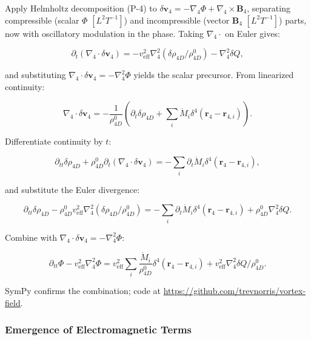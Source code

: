 Apply Helmholtz decomposition (P-4) to $\delta \mathbf{v}_4 = -\nabla_4 \Phi + \nabla_4 \times \mathbf{B}_4$, separating compressible (scalar $\Phi$ $[L^2 T^{-1}]$) and incompressible (vector $\mathbf{B}_4$ $[L^2 T^{-1}]$) parts, now with oscillatory modulation in the phase. Taking $\nabla_4 \cdot$ on Euler gives:

\begin{equation}
\partial_t (\nabla_4 \cdot \delta \mathbf{v}_4) = -v_{\text{eff}}^2 \nabla_4^2 (\delta \rho_{4D} / \rho_{4D}^0) - \nabla_4^2 \delta Q,
\end{equation}

and substituting $\nabla_4 \cdot \delta \mathbf{v}_4 = -\nabla_4^2 \Phi$ yields the scalar precursor. From linearized continuity:

\begin{equation}
\nabla_4 \cdot \delta \mathbf{v}_4 = -\frac{1}{\rho_{4D}^0} \left( \partial_t \delta \rho_{4D} + \sum_i \dot{M}_i \delta^4(\mathbf{r}_4 - \mathbf{r}_{4,i}) \right).
\end{equation}

Differentiate continuity by $t$:

\begin{equation}
\partial_{tt} \delta \rho_{4D} + \rho_{4D}^0 \partial_t (\nabla_4 \cdot \delta \mathbf{v}_4) = -\sum_i \partial_t \dot{M}_i \delta^4(\mathbf{r}_4 - \mathbf{r}_{4,i}),
\end{equation}

and substitute the Euler divergence:

\begin{equation}
\partial_{tt} \delta \rho_{4D} - \rho_{4D}^0 v_{\text{eff}}^2 \nabla_4^2 (\delta \rho_{4D} / \rho_{4D}^0) = -\sum_i \partial_t \dot{M}_i \delta^4(\mathbf{r}_4 - \mathbf{r}_{4,i}) + \rho_{4D}^0 \nabla_4^2 \delta Q.
\end{equation}

Combine with $\nabla_4 \cdot \delta \mathbf{v}_4 = -\nabla_4^2 \Phi$:

\begin{equation}
\partial_{tt} \Phi - v_{\text{eff}}^2 \nabla_4^2 \Phi = v_{\text{eff}}^2 \sum_i \frac{\dot{M}_i}{\rho_{4D}^0} \delta^4(\mathbf{r}_4 - \mathbf{r}_{4,i}) + v_{\text{eff}}^2 \nabla_4^2 \delta Q / \rho_{4D}^0.
\end{equation}

SymPy confirms the combination; code at \url{https://github.com/trevnorris/vortex-field}.

\subsubsection{Emergence of Electromagnetic Terms}

